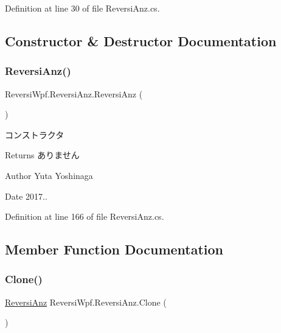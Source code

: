 Definition at line 30 of file Reversi\+Anz.\+cs.



\subsection{Constructor \& Destructor Documentation}
\mbox{\label{class_reversi_wpf_1_1_reversi_anz_adf76e81b047fd35230e796dec68ac8e1}} 
\subsubsection{\texorpdfstring{Reversi\+Anz()}{ReversiAnz()}}
{\footnotesize\ttfamily Reversi\+Wpf.\+Reversi\+Anz.\+Reversi\+Anz (\begin{DoxyParamCaption}{ }\end{DoxyParamCaption})}



コンストラクタ 

\begin{DoxyReturn}{Returns}
ありません 
\end{DoxyReturn}
\begin{DoxyAuthor}{Author}
Yuta Yoshinaga 
\end{DoxyAuthor}
\begin{DoxyDate}{Date}
2017.. 
\end{DoxyDate}


Definition at line 166 of file Reversi\+Anz.\+cs.



\subsection{Member Function Documentation}
\mbox{\label{class_reversi_wpf_1_1_reversi_anz_a6c0bd1b9ea1e1560e1b0338f21a26b5c}} 
\subsubsection{\texorpdfstring{Clone()}{Clone()}}
{\footnotesize\ttfamily \hyperlink{class_reversi_wpf_1_1_reversi_anz}{Reversi\+Anz} Reversi\+Wpf.\+Reversi\+Anz.\+Clone (\begin{DoxyParamCaption}{ }\end{DoxyParamCaption})}



